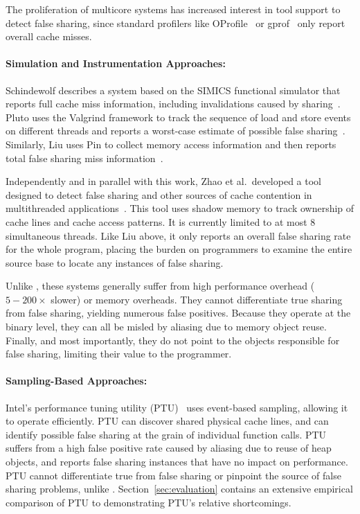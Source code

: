 \label{sec:relatedwork}

The proliferation of multicore systems has increased interest in tool
support to detect false sharing, since standard profilers like
OProfile~\cite{oprofile} or gprof~\cite{gprof} only report overall
cache misses.

\paragraph{Simulation and Instrumentation Approaches:} Schindewolf describes a system based on the SIMICS functional
simulator that reports full cache miss information, including
invalidations caused by
sharing~\cite{falseshare:simulator}. Pluto
uses the Valgrind framework to track the sequence of load and store
events on different threads and reports a worst-case estimate of
possible false sharing~\cite{falseshare:binaryinstrumentation1}. Similarly,
Liu uses Pin to collect
memory access information and then reports total false sharing miss
information~\cite{falseshare:binaryinstrumentation2}.

Independently and in parallel with this work, Zhao et al.\ developed a
tool designed to detect false sharing and other sources of cache
contention in multithreaded applications~\cite{zhao:vee:2011}. This
tool uses shadow memory to track ownership of cache lines and cache
access patterns. It is currently limited to at most 8 simultaneous
threads. Like Liu above, it only reports an overall false sharing rate
for the whole program, placing the burden on programmers to examine
the entire source base to locate any instances of false
sharing.

Unlike \sheriffdetect{}, these systems generally suffer from high
performance overhead ($5-200\times$ slower) or memory overheads.
They cannot differentiate true sharing
from false sharing, yielding numerous false positives. Because they
operate at the binary level, they can all be misled by aliasing due to
memory object reuse. Finally, and most importantly, they do not point
to the objects responsible for false sharing, limiting their value to
the programmer.

\paragraph{Sampling-Based Approaches:}
Intel's performance tuning utility (PTU)~\cite{detect:ptu,
detect:intel} uses event-based sampling, allowing it to operate
efficiently. PTU can discover shared physical cache lines, and can
identify possible false sharing at the grain of individual function
calls. PTU suffers from a high false positive rate caused by aliasing
due to reuse of heap objects, and reports false sharing instances that
have no impact on performance. PTU cannot differentiate true from
false sharing or pinpoint the source of false sharing problems,
unlike \sheriffdetect{}. Section~\ref{sec:evaluation} contains an
extensive empirical comparison of PTU to \sheriffdetect{}
demonstrating PTU's relative shortcomings.

